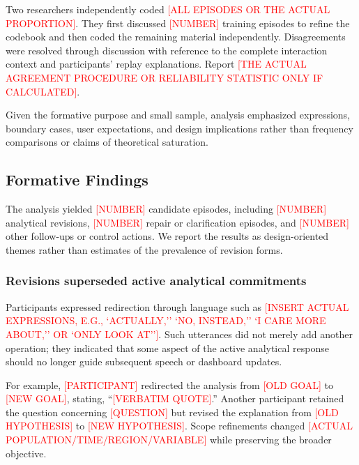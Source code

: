 \documentclass[journal]{IEEEtran}
\begin{document}
Two researchers independently coded
\textcolor{red}{[ALL EPISODES OR THE ACTUAL PROPORTION]}. They first discussed
\textcolor{red}{[NUMBER]} training episodes to refine the codebook and then
coded the remaining material independently. Disagreements were resolved
through discussion with reference to the complete interaction context and
participants' replay explanations. Report
\textcolor{red}{[THE ACTUAL AGREEMENT PROCEDURE OR RELIABILITY STATISTIC ONLY
IF CALCULATED]}.

Given the formative purpose and small sample, analysis emphasized expressions,
boundary cases, user expectations, and design implications rather than
frequency comparisons or claims of theoretical saturation.

\subsection{Formative Findings}
\label{sec:formative-findings}

The analysis yielded \textcolor{red}{[NUMBER]} candidate episodes, including
\textcolor{red}{[NUMBER]} analytical revisions,
\textcolor{red}{[NUMBER]} repair or clarification episodes, and
\textcolor{red}{[NUMBER]} other follow-ups or control actions. We report the
results as design-oriented themes rather than estimates of the prevalence of
revision forms.

\subsubsection{Revisions superseded active analytical commitments}

Participants expressed redirection through language such as
\textcolor{red}{[INSERT ACTUAL EXPRESSIONS, E.G., `ACTUALLY,'' `NO,
INSTEAD,'' `I CARE MORE ABOUT,'' OR `ONLY LOOK AT'']}. Such utterances did
not merely add another operation; they indicated that some aspect of the
active analytical response should no longer guide subsequent speech or
dashboard updates.

For example, \textcolor{red}{[PARTICIPANT]} redirected the analysis from
\textcolor{red}{[OLD GOAL]} to \textcolor{red}{[NEW GOAL]}, stating,
``\textcolor{red}{[VERBATIM QUOTE]}.'' Another participant retained the
question concerning \textcolor{red}{[QUESTION]} but revised the explanation
from \textcolor{red}{[OLD HYPOTHESIS]} to
\textcolor{red}{[NEW HYPOTHESIS]}. Scope refinements changed
\textcolor{red}{[ACTUAL POPULATION/TIME/REGION/VARIABLE]} while preserving the
broader objective.
\end{document}
